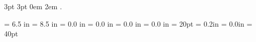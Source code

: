 \usepackage{graphicx}
\usepackage{amssymb}
\usepackage{palatino}
\usepackage{helvet}
\usepackage{amsthm}
\usepackage{ifthen}
\usepackage{dirtree}
\usepackage{listings}
%

\usepackage[hang]{caption}
\setlength{\captionmargin}{30pt}
\renewcommand{\captionlabelfont}{\sffamily\bfseries}

\newcommand{\projname}{Default}

     {3pt}%
     {3pt}%
     {}%
     {0em}%
     {\bfseries\sffamily}%
     {}%
     {2em}%
     {.\quad\rmfamily{}}%
\theoremstyle{requirement}
\newtheorem{requirement}{R}

\newenvironment{sourcecode}
{\begin{minipage}[h]{0.7\linewidth}
\hrulefill
}{
\hrulefill%
\end{minipage}%
}

\textwidth = 6.5 in
\textheight = 8.5 in
\oddsidemargin = 0.0 in
\evensidemargin = 0.0 in
\topmargin = 0.0 in
\headheight = 0.0 in
\headsep = 20pt
\parskip = 0.2in
\parindent = 0.0in
\footskip = 40pt
\setlength{\parskip}{3ex plus 2ex minus 2ex}


\newcommand{\TINOSProjectLogo}{../template/tinos.pdf}
\newcommand{\TINOSProjectAcronym}{ tinos }
\newcommand{\TINOSProjectName}{ tinos }
\newcommand{\TINOSDocumentTitle}{ }
\newcommand{\TINOSDocumentSynopsis}{}
\newcommand{\TINOSDocumentChangeHistory}{}
\newcommand{\TINOSDocumentForAttentionOf}{ }
\newcommand{\TINOSDocumentDate}{ }
\newcommand{\TINOSDocumentVersion}{ }
\newcommand{\TINOSDocumentStatus}{ }
\newcommand{\TINOSDocumentClassification}{ Public}




